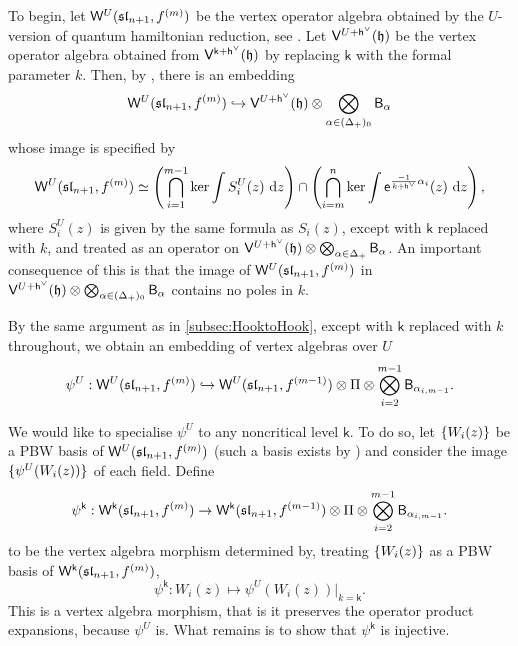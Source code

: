 \documentclass[10pt,a4paper]{amsart}
\numberwithin{equation}{section}
\renewcommand{\cong}{\simeq} %
\newcommand{\dd}{\mathrm{d}}   %
\newcommand{\ee}{\mathsf{e}}   %
\newcommand{\kk}{\mathsf{k}}   %
\DeclarePairedDelimiter{\brac}{\lparen}{\rparen}   %
\DeclarePairedDelimiter{\set}{\lbrace}{\rbrace}
\newcommand{\alg}[1]{\mathfrak{#1}}  %
\newcommand{\VOA}[1]{\mathsf{#1}}    %
\newcommand{\SLA}[2]{\alg{#1}_{#2}}                      %
\newcommand{\slnpone}{\SLA{sl}{n+1}}
\newcommand{\cartan}{\mathfrak{h}}
\newcommand{\cox}{\mathsf{h}}                                        %
\newcommand{\dcox}{\coroot{\cox}}                                    %
\newcommand{\proots}{\Delta_+}                                       %
\newcommand{\sroot}[1]{\alpha_{#1}}                                  %
\newcommand{\coroot}[1]{#1^{\vee}}                                   %
\newcommand{\fhook}[1]{f^{(#1)}}                                  %
\newcommand{\Wsymb}{\VOA{W}}
\newcommand{\uaffvoa}[2]{\VOA{V}^{#1}\brac{#2}}                   %
\newcommand{\bgvoa}{\VOA{B}}                                      %
\newcommand{\uQHR}[3]{\Wsymb^{#1}\brac{#2,#3}}                    %
\theoremstyle{plain}
\begin{document}
To begin, let $\uQHR{U}{\slnpone}{\fhook{m}}$ be the vertex operator algebra obtained by the $U$-version of quantum hamiltonian reduction, see \cite[Sec.~2.2]{GenScreen20}. Let $\uaffvoa{U+\dcox}{\cartan}$ be the vertex operator algebra obtained from $\uaffvoa{\kk+\dcox}{\cartan}$ by replacing $\kk$ with the formal parameter $k$. Then, by \cite[Cor.~4.12]{GenScreen20}, there is an embedding
%
\begin{equation}
    \uQHR{U}{\slnpone}{\fhook{m}} \hookrightarrow \uaffvoa{U+\dcox}{\cartan} \otimes \bigotimes_{\alpha \in (\proots)_0} \bgvoa_\alpha
\end{equation}
%
whose image is specified by
%
\begin{equation}
    \uQHR{U}{\slnpone}{\fhook{m}} \cong \left( \bigcap_{i=1}^{m-1} \textup{ker} \int S^U_i(z) \ \dd z \right) \cap \left(  \bigcap_{i=m}^{n} \textup{ker} \int \ee^{\frac{-1}{k+\dcox} \alpha_{i}}(z) \ \dd z \right),
\end{equation}
%
where $S^U_i(z)$ is given by the same formula as $S_i(z)$, except with $\kk$ replaced with $k$, and treated as an operator on $\uaffvoa{U+\dcox}{\cartan} \otimes \bigotimes_{\alpha \in \proots} \bgvoa_\alpha$. An important consequence of this is that the image of $\uQHR{U}{\slnpone}{\fhook{m}}$ in $\uaffvoa{U+\dcox}{\cartan} \otimes \bigotimes_{\alpha \in (\proots)_0} \bgvoa_\alpha$ contains no poles in $k$.

By the same argument as in \cref{subsec:HooktoHook}, except with $\kk$ replaced with $k$ throughout, we obtain an embedding of vertex algebras over $U$
%
\begin{equation}
    \psi^U: \uQHR{U}{\slnpone}{\fhook{m}} \hookrightarrow \uQHR{U}{\slnpone}{\fhook{m-1}} \otimes \Pi \otimes \bigotimes_{i=2}^{m-1} \bgvoa_{\sroot{i,m-1}}.
\end{equation}

We would like to specialise $\psi^U$ to any noncritical level $\kk$. To do so, let $\set{W_i(z)}$ be a PBW basis of $\uQHR{U}{\slnpone} {\fhook{m}}$ (such a basis exists by \cite[Thm.~4.1]{KacQua04}) and consider the image $\set{\psi^U(W_i(z))}$ of each field. Define 
%
\begin{equation}
    \psi^\kk: \uQHR{\kk}{\slnpone}{\fhook{m}} \rightarrow \uQHR{\kk}{\slnpone}{\fhook{m-1}} \otimes \Pi \otimes \bigotimes_{i=2}^{m-1} \bgvoa_{\sroot{i,m-1}}.
\end{equation}
%
to be the vertex algebra morphism determined by, treating $\set{W_i(z)}$ as a PBW basis of $\uQHR{\kk}{\slnpone}{\fhook{m}}$,
%
\begin{equation}
    \psi^\kk: W_i(z) \mapsto \psi^U(W_i(z)) \Big|_{k=\kk}.
\end{equation}
%
This is a vertex algebra morphism, that is it preserves the operator product expansions, because $\psi^U$ is. What remains is to show that $\psi^\kk$ is injective. 
\end{document}
